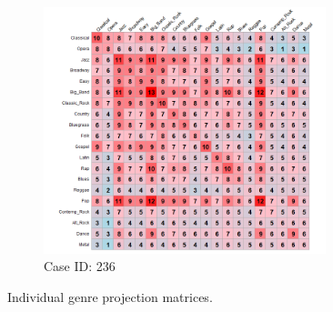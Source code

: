 \documentclass[12pt]{article}
\begin{document}
\begin{figure}[ht!]
\begin{subfigure}[b]{0.49\textwidth}
        \includegraphics[trim={1cm 0cm 0cm 0cm},clip, width=0.9\textwidth]{Plots/data-ex-rp2.png}
            \caption{Case ID: 236}
            \label{fig:ind-ex-rp2}
    \end{subfigure}
    \caption{Individual genre projection matrices.}
    \label{fig:ind-ex-rp}
\end{figure}
\end{document}
